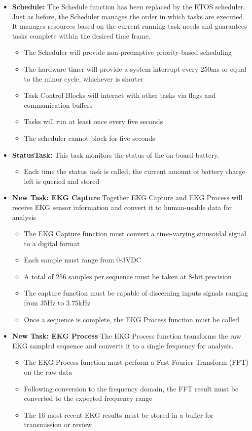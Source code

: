 \documentclass[12pt]{article} %
\begin{document}
\begin{itemize}
	\item \textbf{Schedule:}
		The Schedule function has been replaced by the RTOS scheduler. Just as
		before, the Scheduler manages the order in which tasks are executed. It
		manages resources based on the current running task needs and guarantees
		tasks complete within the desired time frame.
    \begin{itemize}
			\item The Scheduler will provide non-preemptive priority-based scheduling
      \item The hardware timer will provide a system interrupt every 250ms or
	equal to the minor cycle, whichever is shorter
      \item Task Control Blocks will interact with other tasks via flags and communication buffers
			\item Tasks will run at least once every five seconds
      \item The scheduler cannot block for five seconds
    \end{itemize}

	\item \textbf{StatusTask:}
		This task monitors the status of the on-board battery.
    \begin{itemize}
      \item Each time the status task is called, the current amount of battery charge left is queried and stored
    \end{itemize}

	\item \textbf{New Task: EKG Capture}
		Together EKG Capture and EKG Process will receive EKG sensor information
		and convert it to human-usable data for analysis
		\begin{itemize}
			\item The EKG Capture function must convert a time-varying sinusoidal signal to a digital format
		\item Each sample must range from 0-3VDC
			\item A total of 256 samples per sequence must be taken at 8-bit precision
			\item The capture function must be capable of discerning inputs signals ranging from 35Hz to 3.75kHz
			\item Once a sequence is complete, the EKG Process function must be called
		\end{itemize}

	\item \textbf{New Task: EKG Process}
		The EKG Process function transforms the raw EKG sampled sequence and
		converts it to a single frequency for analysis.
		\begin{itemize}
			\item The EKG Process function must perform a Fast Fourier Transform (FFT) on the raw data
			\item Following conversion to the frequency domain, the FFT result must be converted to the expected frequency range
			\item The 16 most recent EKG results must be stored in a buffer for transmission or review
		\end{itemize}


\end{itemize}
\end{document}
